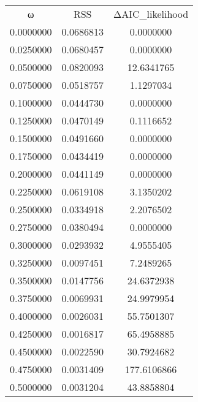 \begin{tabular}{ccc}
ω & RSS & ΔAIC_likelihood\\
0.0000000 & 0.0686813 & 0.0000000\\
0.0250000 & 0.0680457 & 0.0000000\\
0.0500000 & 0.0820093 & 12.6341765\\
0.0750000 & 0.0518757 & 1.1297034\\
0.1000000 & 0.0444730 & 0.0000000\\
0.1250000 & 0.0470149 & 0.1116652\\
0.1500000 & 0.0491660 & 0.0000000\\
0.1750000 & 0.0434419 & 0.0000000\\
0.2000000 & 0.0441149 & 0.0000000\\
0.2250000 & 0.0619108 & 3.1350202\\
0.2500000 & 0.0334918 & 2.2076502\\
0.2750000 & 0.0380494 & 0.0000000\\
0.3000000 & 0.0293932 & 4.9555405\\
0.3250000 & 0.0097451 & 7.2489265\\
0.3500000 & 0.0147756 & 24.6372938\\
0.3750000 & 0.0069931 & 24.9979954\\
0.4000000 & 0.0026031 & 55.7501307\\
0.4250000 & 0.0016817 & 65.4958885\\
0.4500000 & 0.0022590 & 30.7924682\\
0.4750000 & 0.0031409 & 177.6106866\\
0.5000000 & 0.0031204 & 43.8858804\\
\end{tabular}

